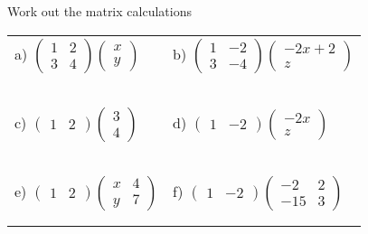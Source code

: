 \documentclass[fontsize=12pt]{scrartcl}
\begin{document}
\newpage
Work out the matrix calculations
\newline
\newline
\begin{tabular}{p{9cm}p{9cm}}
a) $\begin{pmatrix}1&2\\3&4 \end{pmatrix}\begin{pmatrix}x\\y \end{pmatrix}$
&b) $\begin{pmatrix}1&-2\\3&-4 \end{pmatrix} \begin{pmatrix}-2x+2\\z \end{pmatrix}$
\\\\\\
\\\\\\

c) $\begin{pmatrix}1&2 \end{pmatrix}\begin{pmatrix}3\\4 \end{pmatrix}$
&d) $\begin{pmatrix}1&-2 \end{pmatrix} \begin{pmatrix}-2x\\z \end{pmatrix}$
\\\\\\
\\\\\\

e) $\begin{pmatrix}1&2 \end{pmatrix}\begin{pmatrix}x&4\\y&7 \end{pmatrix}$
&f) $\begin{pmatrix}1&-2 \end{pmatrix} \begin{pmatrix}-2&2\\-15&3 \end{pmatrix}$
\\\\\\
\end{tabular}
\end{document}
